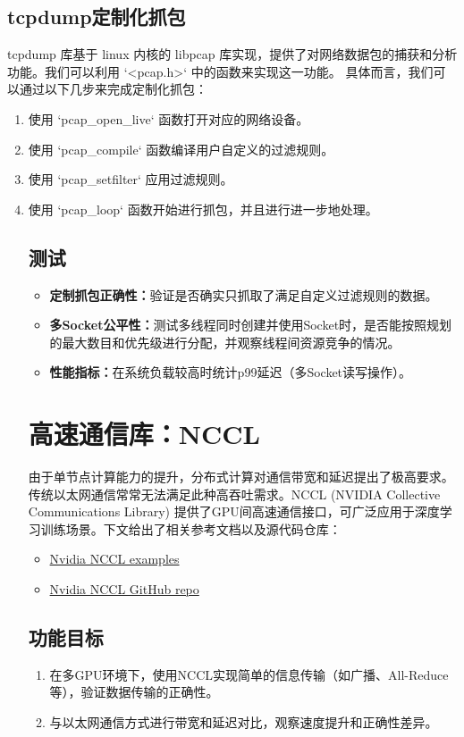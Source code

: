 \subsection{tcpdump定制化抓包}
tcpdump 库基于 linux 内核的 libpcap 库实现，提供了对网络数据包的捕获和分析功能。我们可以利用 `<pcap.h>` 中的函数来实现这一功能。
具体而言，我们可以通过以下几步来完成定制化抓包：
\begin{enumerate}
    \item 使用 `pcap\_open\_live` 函数打开对应的网络设备。
    \item 使用 `pcap\_compile` 函数编译用户自定义的过滤规则。
    \item 使用 `pcap\_setfilter` 应用过滤规则。
    \item 使用 `pcap\_loop` 函数开始进行抓包，并且进行进一步地处理。

\subsection{测试}
\begin{itemize}
    \item \textbf{定制抓包正确性：}验证是否确实只抓取了满足自定义过滤规则的数据。  
    \item \textbf{多Socket公平性：}测试多线程同时创建并使用Socket时，是否能按照规划的最大数目和优先级进行分配，并观察线程间资源竞争的情况。
    \item \textbf{性能指标：}在系统负载较高时统计p99延迟（多Socket读写操作）。
\end{itemize}

\section{高速通信库：NCCL}
由于单节点计算能力的提升，分布式计算对通信带宽和延迟提出了极高要求。传统以太网通信常常无法满足此种高吞吐需求。NCCL (NVIDIA Collective Communications Library) 提供了GPU间高速通信接口，可广泛应用于深度学习训练场景。下文给出了相关参考文档以及源代码仓库：
\begin{itemize}
    \item \href{https://docs.nvidia.com/deeplearning/nccl/user-guide/docs/examples.html#communicator-creation-and-destruction-examples}{Nvidia NCCL examples}
    \item \href{https://github.com/NVIDIA/nccl}{Nvidia NCCL GitHub repo}
\end{itemize}

\subsection{功能目标}
\begin{enumerate}
    \item 在多GPU环境下，使用NCCL实现简单的信息传输（如广播、All-Reduce等），验证数据传输的正确性。
    \item 与以太网通信方式进行带宽和延迟对比，观察速度提升和正确性差异。
\end{enumerate}


\end{enumerate}
